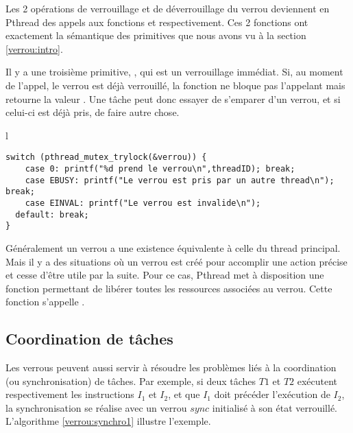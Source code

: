 Les 2 opérations de verrouillage et de déverrouillage du verrou deviennent en Pthread des appels aux fonctions  et  respectivement. Ces 2 fonctions ont exactement la sémantique des primitives que nous avons vu à la section \ref{verrou:intro}.

Il y a une troisième primitive, , qui est un verrouillage immédiat. Si, au moment de l'appel, le verrou est déjà verrouillé, la fonction ne bloque pas l'appelant mais retourne la valeur . Une tâche peut donc essayer de s'emparer d'un verrou, et si celui-ci est déjà pris, de faire autre chose.
\begin{center}
\vspace{-0.2 cm}
\begin{tabular}{l}
\begin{lstlisting}
switch (pthread_mutex_trylock(&verrou)) {
	case 0: printf("%d prend le verrou\n",threadID); break;
	case EBUSY: printf("Le verrou est pris par un autre thread\n"); break;
	case EINVAL: printf("Le verrou est invalide\n");
  default: break;
}
\end{lstlisting}
\end{tabular}
\end{center}

Généralement un verrou a une existence équivalente à celle du thread principal. Mais il y a des situations où un verrou est créé pour accomplir une action précise et cesse d'être utile par la suite. Pour ce cas, Pthread met à disposition une fonction permettant de libérer toutes les ressources associées au verrou. Cette fonction s'appelle .

\subsection{Coordination de tâches}
Les verrous peuvent aussi servir à résoudre les problèmes liés à la coordination (ou synchronisation) de tâches.  Par exemple, si deux tâches $T1$ et $T2$ exécutent respectivement les instructions $I_1$ et $I_2$, et que $I_1$ doit précéder l'exécution de $I_2$, la synchronisation se réalise avec un verrou $sync$ initialisé à son état verrouillé.
L'algorithme \ref{verrou:synchro1} illustre l'exemple.

